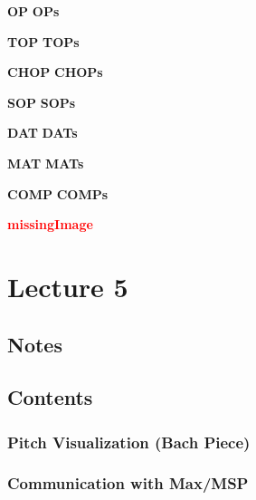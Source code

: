 
\def\boldcommandlist{\@elt OP,\@elt OPs,}
\def\@elt#1,{%
 \expandafter\def\csname#1\endcsname{\textbf{#1}\xspace}
}
\boldcommandlist

\def\topColorList{\@elt TOP,\@elt TOPs,}
\def\@elt#1,{%
 \expandafter\def\csname#1\endcsname{\textcolor{TOP}{\textbf{#1}}\xspace}
}
\topColorList

\def\chopColorList{\@elt CHOP,\@elt CHOPs,}
\def\@elt#1,{%
 \expandafter\def\csname#1\endcsname{\textcolor{CHOP}{\textbf{#1}}\xspace}
}
\chopColorList

\def\sopColorList{\@elt SOP,\@elt SOPs,}
\def\@elt#1,{%
 \expandafter\def\csname#1\endcsname{\textcolor{SOP}{\textbf{#1}}\xspace}
}
\sopColorList

\def\datColorList{\@elt DAT,\@elt DATs,}
\def\@elt#1,{%
 \expandafter\def\csname#1\endcsname{\textcolor{DAT}{\textbf{#1}}\xspace}
}
\datColorList

\def\matColorList{\@elt MAT,\@elt MATs,}
\def\@elt#1,{%
 \expandafter\def\csname#1\endcsname{\textcolor{MAT}{\textbf{#1}}\xspace}
}
\matColorList


\def\compColorList{\@elt COMP,\@elt COMPs,}
\def\@elt#1,{%
 \expandafter\def\csname#1\endcsname{\textcolor{COMP}{\textbf{#1}}\xspace}
}
\compColorList

\def\redcommandlist{\@elt missingImage,}
\def\@elt#1,{%
 \expandafter\def\csname#1\endcsname{\textcolor{red}{\textbf{#1}}\xspace}
}
\redcommandlist


\chapter{Lecture 5}

\section*{Notes}

\section*{Contents}

\subsection*{Pitch Visualization (Bach Piece)} %
\subsection*{Communication with Max/MSP} %

